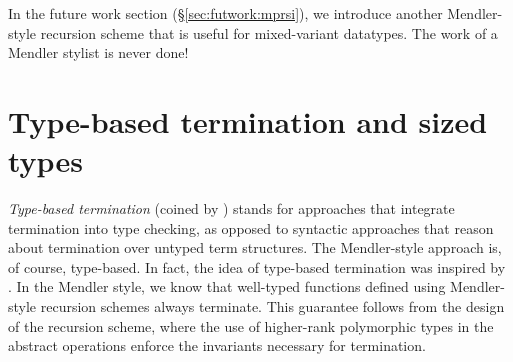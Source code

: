 In the future work section (\S\ref{sec:futwork:mprsi}), we introduce 
another Mendler-style recursion scheme that is useful for
mixed-variant datatypes. The work of a Mendler stylist is never done!



\section[Type-based termination and sized types]{
	 Type-based termination and sized types\footnotemark{} }
\label{sec:relwork:sized}
\emph{Type-based termination} (coined by \citet{BartheFGPU04}) stands for
approaches that integrate termination into type checking, as opposed to
syntactic approaches that reason about termination over untyped term structures.
The Mendler-style approach is, of course, type-based.  In fact, the idea of
type-based termination was inspired by \citet{Mendler87,Mendler91}.
In the Mendler style, we know that well-typed functions defined using
Mendler-style recursion schemes always terminate.  This guarantee follows
from the design of the recursion scheme, where the use of higher-rank 
polymorphic types in the abstract operations enforce the invariants
necessary for termination.

